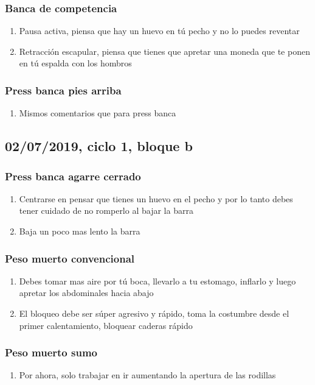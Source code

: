 \documentclass[11pt]{article}
\begin{document}
\subsubsection{Banca de competencia}
\label{sec:orge08fe83}
\begin{enumerate}
\item Pausa activa, piensa que hay un huevo en tú pecho y no lo puedes
reventar
\item Retracción escapular, piensa que tienes que apretar una moneda que
te ponen en tú espalda con los hombros
\end{enumerate}
\subsubsection{Press banca pies arriba}
\label{sec:org6171e4a}
\begin{enumerate}
\item Mismos comentarios que para press banca
\end{enumerate}
\subsection{02/07/2019, ciclo 1, bloque b}
\label{sec:orgd81f322}
\subsubsection{Press banca agarre cerrado}
\label{sec:org941d3c4}
\begin{enumerate}
\item Centrarse en pensar que tienes un huevo en el pecho y por lo tanto
debes tener cuidado de no romperlo al bajar la barra
\item Baja un poco mas lento la barra
\end{enumerate}
\subsubsection{Peso muerto convencional}
\label{sec:orgcaeff0e}
\begin{enumerate}
\item Debes tomar mas aire por tú boca, llevarlo a tu estomago, inflarlo
y luego apretar los abdominales hacia abajo
\item El bloqueo debe ser súper agresivo y rápido, toma la costumbre
desde el primer calentamiento, bloquear caderas rápido
\end{enumerate}
\subsubsection{Peso muerto sumo}
\label{sec:orgccba87b}
\begin{enumerate}
\item Por ahora, solo trabajar en ir aumentando la apertura de las rodillas
\end{enumerate}
\end{document}
